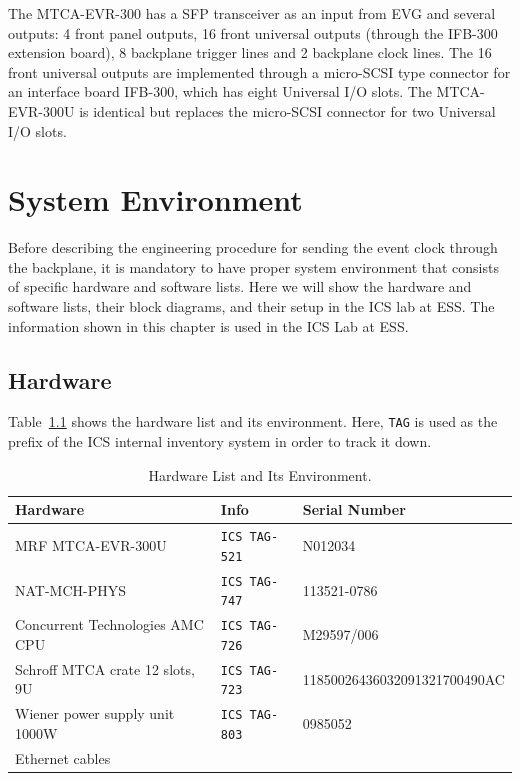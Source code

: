 \documentclass[11pt
  , a4paper
  , article
  , oneside
  , showtrims
]{memoir}
\begin{document}
The MTCA-EVR-300 has a SFP transceiver as an input from EVG and several outputs: 4 front panel outputs, 16 front universal outputs (through the IFB-300 extension board), 8 backplane trigger lines and 2 backplane clock lines. The 16 front universal outputs are implemented through a micro-SCSI type connector for an interface board IFB-300, which has eight Universal I/O slots. The MTCA-EVR-300U is identical but replaces the micro-SCSI connector for two Universal I/O slots.

\clearpage

\chapter{System Environment}
Before describing the engineering procedure for sending the event clock through the backplane, it is mandatory to have proper system environment that consists of specific hardware and software lists. Here we will show the hardware and software lists, their block diagrams, and their setup in the ICS lab at ESS. The information shown in this chapter is used in the ICS Lab at ESS.


\section{Hardware}
Table~\ref{table:hwlist} shows the hardware list and its environment. Here, \texttt{TAG} is used as the prefix of the ICS internal inventory system in order to track it down.
\begin{table}[!hb]
  \centering
  \begin{tabular}{l|l|l}
    \toprule
    Hardware                        & Info                                               & Serial Number \\\midrule
    MRF MTCA-EVR-300U               & \texttt{ICS TAG-521}                               & N012034       \\\midrule
    NAT-MCH-PHYS                    & \texttt{ICS TAG-747}                               & 113521-0786    \\\midrule
    Concurrent Technologies AMC CPU & \texttt{ICS TAG-726}                               & M29597/006     \\\midrule
    Schroff MTCA crate 12 slots, 9U    & \texttt{ICS TAG-723}                               & 11850026436032091321700490AC      \\\midrule
    Wiener power supply unit 1000W  & \texttt{ICS TAG-803}                               & 0985052       \\\midrule
    Ethernet cables                 &                                                    &               \\\bottomrule
  \end{tabular}
  \caption[]{Hardware List and Its Environment.}
  \label{table:hwlist}
\end{table}
\end{document}
